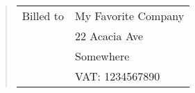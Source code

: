 \documentclass[a4paper]{report}
\author{Name Surname}
\def \clientHeading {Billed to}
\def \clientName {My Favorite Company}
\def \clientAddress {22 Acacia Ave}
\def \clientCity {Somewhere}
\def \clientVat {VAT: 1234567890}
\begin{document}
\begin{minipage}[t]{\textwidth}
  \begin{verse}
    \begin{flushright}
      \begin{tabular}{rl}
        \clientHeading & \clientName
        \\[3pt]
        & \clientAddress
        \\[3pt]
        & \clientCity
        \\[3pt]
        & \clientVat
      \end{tabular}
    \end{flushright}
  \end{verse}
\end{minipage}
\end{document}
